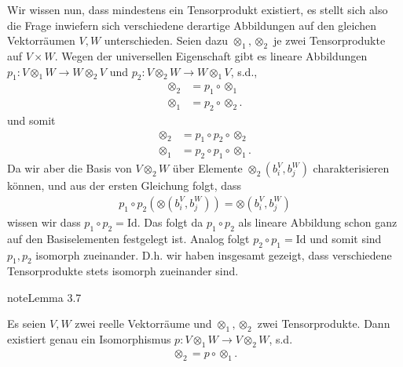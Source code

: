 \documentclass[letterpaper,10pt,english]{jupyterBook}
\begin{document}
\sphinxAtStartPar
Wir wissen nun, dass mindestens ein Tensorprodukt existiert, es stellt sich also die Frage inwiefern sich verschiedene derartige Abbildungen auf den gleichen Vektorräumen \(V,W\) unterschieden. Seien dazu \(\otimes_1, \otimes_2\) je zwei Tensorprodukte auf \(V\times W\). Wegen der universellen Eigenschaft gibt es lineare Abbildungen \(p_1: V\otimes_1 W\to W\otimes_2 V\) und \(p_2: V\otimes_2 W\to W\otimes_1 V\), s.d.,
\begin{equation*}
\begin{split}\otimes_2 &= p_1 \circ \otimes_1\\
\otimes_1 &= p_2 \circ \otimes_2.\end{split}
\end{equation*}
\sphinxAtStartPar
und somit
\begin{equation*}
\begin{split}\otimes_2 &= p_1\circ p_2 \circ \otimes_2\\
\otimes_1 &= p_2\circ p_1 \circ \otimes_1.\end{split}
\end{equation*}
\sphinxAtStartPar
Da wir aber die Basis von \(V\otimes_2 W\) über Elemente \(\otimes_2(b_i^V, b_j^W)\) charakterisieren können, und aus der ersten Gleichung folgt, dass
\begin{equation*}
\begin{split}p_1\circ p_2(\otimes(b_i^V,b_j^W)) = \otimes(b_i^V, b_j^W)\end{split}
\end{equation*}
\sphinxAtStartPar
wissen wir dass \(p_1\circ p_2 = \mathrm{Id}\). Das folgt da \(p_1\circ p_2\) als lineare Abbildung schon ganz auf den Basiselementen festgelegt ist.
Analog folgt \(p_2\circ p_1 = \mathrm{Id}\) und somit sind \(p_1, p_2\) isomorph zueinander. D.h. wir haben insgesamt gezeigt, dass verschiedene Tensorprodukte stets isomorph zueinander sind.
\label{vektoranalysis/tensor:lemma-4}
\begin{sphinxadmonition}{note}{Lemma 3.7}



\sphinxAtStartPar
Es seien \(V,W\) zwei reelle Vektorräume und \(\otimes_1,\otimes_2\) zwei Tensorprodukte. Dann existiert genau ein Isomorphismus \(p:V\otimes_1 W\to V\otimes_2 W\), s.d.
\begin{equation*}
\begin{split}\otimes_2 = p\circ \otimes_1.\end{split}
\end{equation*}\end{sphinxadmonition}
\end{document}
